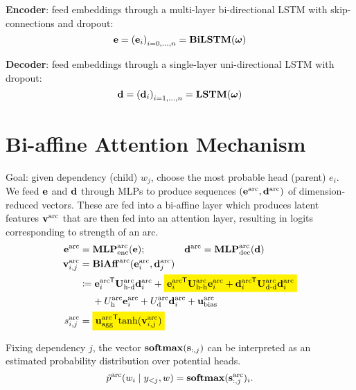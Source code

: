 \documentclass{report}
\theoremstyle{definition}
\theoremstyle{plain}
\theoremstyle{definition}
\theoremstyle{remark}
\numberwithin{equation}{section}
\numberwithin{figure}{section}
\numberwithin{table}{section}
\newcommand{\mathcolorbox}[2]{\colorbox{#1}{$\displaystyle #2$}}
\newcommand*{\tran}{^{\mkern-1.5mu\mathsf{T}}}
\begin{document}
\textbf{Encoder}: feed embeddings through a multi-layer bi-directional LSTM with skip-connections and dropout:
\[
    \vb{e} = \qty(\vb{e}_{i})_{i = 0, \ldots, n} = \mathbf{BiLSTM}(\boldsymbol{\omega})
\]

\textbf{Decoder}: feed embeddings through a single-layer uni-directional LSTM with dropout:
\[
    \vb{d} = \qty(\vb{d}_{i})_{i = 1, \ldots, n} = \mathbf{LSTM}(\boldsymbol{\omega})
\]

\section{Bi-affine Attention Mechanism}
Goal: given dependency (child) \(w_{j}\), choose the most probable head (parent) \(e_{i}\). We feed \(\vb{e}\) and \(\vb{d}\) through MLPs to produce sequences \((\vb{e}^{\mathrm{arc}}, \vb{d}^{\mathrm{arc}})\) of dimension-reduced vectors. These are fed into a bi-affine layer which produces latent features \(\vb{v}^{\mathrm{arc}}\) that are then fed into an attention layer, resulting in logits corresponding to strength of an arc.
\begin{align}
    \vb{e}^{\mathrm{arc}} &= \mathbf{MLP}_{\mathrm{enc}}^{\mathrm{arc}}(\vb{e}); \qquad \qquad \vb{d}^{\mathrm{arc}} = \mathbf{MLP}_{\mathrm{dec}}^{\mathrm{arc}}(\vb{d}) \\
    \vb{v}^{\mathrm{arc}}_{i,j} &= \mathbf{BiAff}^{\mathrm{arc}}(\vb{e}^{\mathrm{arc}}_{i}, \vb{d}^{\mathrm{arc}}_{j}) \\
    &\coloneqq {\vb{e}^{\mathrm{arc}}_{i}}\tran \mathbf{U}_{\text{h-d}}^{\mathrm{arc}} \vb{d}_{i}^{\mathrm{arc}}  + \mathcolorbox{yellow}{
            {\vb{e}_{i}^{\mathrm{arc}}}\tran \mathbf{U}_{\text{h-h}}^{\mathrm{arc}} \vb{e}_{i}^{\mathrm{arc}}
            + {\vb{d}_{i}^{\mathrm{arc}}}\tran \mathbf{U}_{\text{d-d}}^{\mathrm{arc}} \vb{d}_{i}^{\mathrm{arc}}
        } \\
        &\phantom{\coloneqq}\  + U_{\text{h}}^{\mathrm{arc}} \vb{e}_{i}^{\mathrm{arc}}
        + U_{\text{d}}^{\mathrm{arc}} \vb{d}_{i}^{\mathrm{arc}}
        + \vb{u}_{\text{bias}}^{\mathrm{arc}} \\
        s_{i,j}^{\mathrm{arc}} &= \mathcolorbox{yellow}{{\vb{u}_{\text{agg}}^{\mathrm{arc}}} \tran \mathrm{tanh}(\vb{v}_{i,j}^{\mathrm{arc}})}
\end{align}

Fixing dependency \(j\), the vector \(\mathbf{softmax}(\vb{s}_{:, j})\) can be interpreted as an estimated probability distribution over potential heads.
\[
    \hat{p}^{\mathrm{arc}}(w_{i} \mid y_{<j}, w) = \mathbf{softmax}(\vb{s}_{:,j}^{\mathrm{arc}})_{i}.
\]
\end{document}
